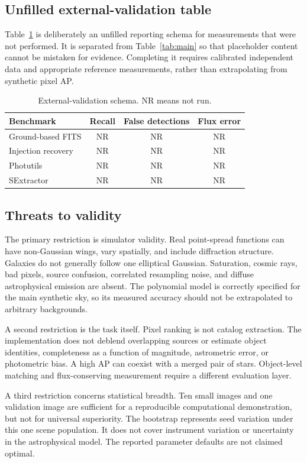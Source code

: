 \documentclass[conference]{IEEEtran}
\begin{document}
\subsection{Unfilled external-validation table}
Table~\ref{tab:pending} is deliberately an unfilled reporting schema for measurements that were not performed. It is separated from Table~\ref{tab:main} so that placeholder content cannot be mistaken for evidence. Completing it requires calibrated independent data and appropriate reference measurements, rather than extrapolating from synthetic pixel AP.
\begin{table}[t]
\caption{External-validation schema. NR means not run.}
\label{tab:pending}
\centering
\setlength{\tabcolsep}{3pt}
\small
\begin{tabular}{lccc}
\toprule
Benchmark & Recall & False detections & Flux error\\
\midrule
Ground-based FITS & NR & NR & NR\\
Injection recovery & NR & NR & NR\\
Photutils & NR & NR & NR\\
SExtractor & NR & NR & NR\\
\bottomrule
\end{tabular}
\end{table}

\subsection{Threats to validity}
The primary restriction is simulator validity. Real point-spread functions can have non-Gaussian wings, vary spatially, and include diffraction structure. Galaxies do not generally follow one elliptical Gaussian. Saturation, cosmic rays, bad pixels, source confusion, correlated resampling noise, and diffuse astrophysical emission are absent. The polynomial model is correctly specified for the main synthetic sky, so its measured accuracy should not be extrapolated to arbitrary backgrounds.

A second restriction is the task itself. Pixel ranking is not catalog extraction. The implementation does not deblend overlapping sources or estimate object identities, completeness as a function of magnitude, astrometric error, or photometric bias. A high AP can coexist with a merged pair of stars. Object-level matching and flux-conserving measurement require a different evaluation layer.

A third restriction concerns statistical breadth. Ten small images and one validation image are sufficient for a reproducible computational demonstration, but not for universal superiority. The bootstrap represents seed variation under this one scene population. It does not cover instrument variation or uncertainty in the astrophysical model. The reported parameter defaults are not claimed optimal.
\end{document}
